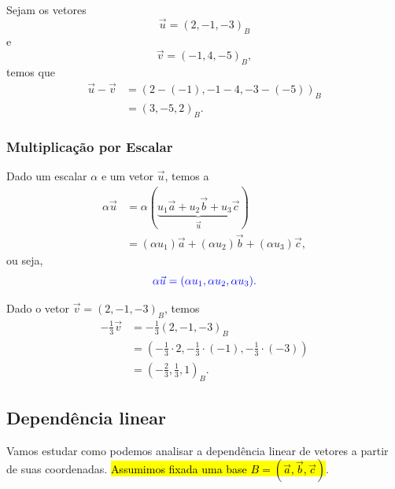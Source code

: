 \begin{ex}
  Sejam os vetores 
  \begin{equation}
    \vec{u} = (2, -1, -3)_B
  \end{equation}
  e 
  \begin{equation}
    \vec{v} = (-1, 4, -5)_B,
  \end{equation}
  temos que
  \begin{align}
    \vec{u}-\vec{v} &= \left(2-(-1), -1-4, -3-(-5)\right)_B\\
                    &= (3,-5,2)_B.
  \end{align}
\end{ex}

\subsubsection{Multiplicação por Escalar}

Dado um escalar $\alpha$ e um vetor $\vec{u}$, temos a 
\begin{align}
  \alpha\vec{u} &= \alpha(\underbrace{u_1\vec{a} + u_2\vec{b} + u_3\vec{c}}_{\vec{u}})\\
                &= (\alpha u_1)\vec{a} + (\alpha u_2)\vec{b} + (\alpha u_3)\vec{c},
\end{align}
ou seja,
\begin{equation}\color{blue}\alpha\vec{u} = (\alpha u_1,\alpha u_2, \alpha u_3).
\end{equation}

\begin{ex}
  Dado o vetor $\vec{v} = (2, -1, -3)_B$, temos
  \begin{align}
    -\frac{1}{3}\vec{v} &= -\frac{1}{3}(2, -1, -3)_B\\
                        &= \left(-\frac{1}{3}\cdot 2, -\frac{1}{3}\cdot(-1), -\frac{1}{3}\cdot(-3)\right)\\
                        &= \left(-\frac{2}{3}, \frac{1}{3}, 1\right)_B.
  \end{align}
\end{ex}

\subsection{Dependência linear}\label{cap_base_sec_base_subsec_dl}

Vamos estudar como podemos analisar a dependência linear de vetores a partir de suas coordenadas. \hl{Assumimos fixada uma base $B = \left(\vec{a}, \vec{b}, \vec{c}\right)$}.

